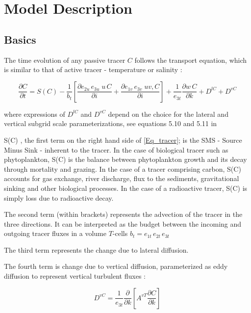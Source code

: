 \documentclass[../main/TOP_manual]{subfiles}
\begin{document}
\chapter{Model Description}
\label{chap:ModDes}
\chaptertoc

\section{Basics}
\label{sec:Bas}

The time evolution of any passive tracer $C$ follows the transport equation, which is similar to that of active tracer - temperature or salinity :

\begin{equation}
\frac{\partial C}{\partial t} = {S(C)} -  \frac{1}{b_t} \left[   \frac{\partial e_{2u}\,e_{3u} \;  u\, C}{\partial i} +   \frac{\partial e_{1v}\,e_{3v} \;  uv, C}{\partial i}  \right] + \frac{1}{e_{3t}} \frac{\partial w\, C}{\partial k} + D^{lC} + D^{vC}
\label{Eq_tracer}
\end{equation}

where expressions of $D^{lC}$ and $D^{vC}$ depend on the choice for the lateral and vertical subgrid scale parameterizations, see equations 5.10 and 5.11 in \citep{nemo_manual}

{S(C)} , the first term on the right hand side of \ref{Eq_tracer}; is the SMS - Source Minus Sink - inherent to the tracer.  In the case of biological tracer such as phytoplankton, {S(C)} is the balance between phytoplankton growth and its decay through mortality and grazing. In the case of a tracer comprising carbon,  {S(C)} accounts for gas exchange, river discharge, flux to the sediments, gravitational sinking and other biological processes. In the case of a radioactive tracer, {S(C)} is simply loss due to radioactive decay.

The second term (within brackets) represents the advection of the tracer in the three directions. It can be interpreted as the budget between the incoming and outgoing tracer fluxes in a volume $T$-cells $b_t= e_{1t}\,e_{2t}\,e_{3t}$

The third term  represents the change due to lateral diffusion.

The fourth term is change due to vertical diffusion, parameterized as eddy diffusion to represent vertical turbulent fluxes :

\begin{equation}
D^{vC} =  \frac{1}{e_{3t}} \frac{\partial}{\partial k} \left[  A^{vT} \frac{\partial C}{\partial k} \right]
\label{Eq_trczdf}
\end{equation}
\end{document}
